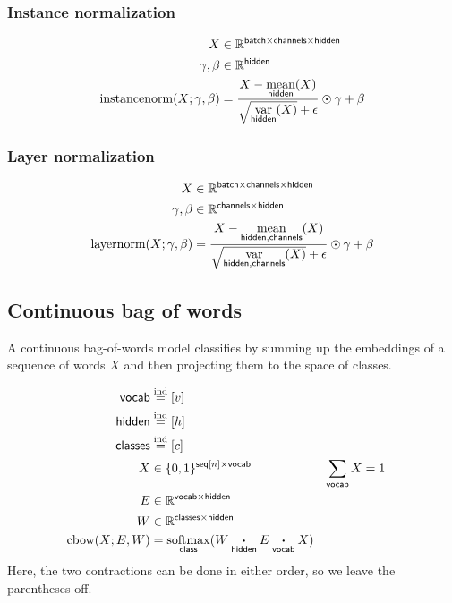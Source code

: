 \documentclass{article}
\newcommand{\reals}{\mathbb{R}}
\begin{document}
\subsubsection*{Instance normalization}

\begin{align*} 
X &\in \reals^{{\name{batch} \times \name{channels} \times \name{hidden}}}\\
\gamma, \beta &\in \reals^{{\name{hidden}}} \\
\text{instancenorm}(X; \gamma, \beta) &= \frac{X - \nfun{hidden}{\text{mean}}(X)}{\sqrt{\nfun{hidden}{\text{var}}(X)} + \epsilon} \odot \gamma + \beta
\end{align*}

\subsubsection*{Layer normalization}

\begin{align*} 
X &\in \reals^{{\name{batch} \times \name{channels} \times \name{hidden}}} \\
\gamma, \beta &\in \reals^{{\name{channels} \times \name{hidden}}} \\
\text{layernorm}(X; \gamma, \beta) &= \frac{X - \nfun{hidden,channels}{\text{mean}}(X)}{\sqrt{\nfun{hidden, channels}{\text{var}}(X)} + \epsilon} \odot \gamma + \beta 
\end{align*}


\subsection{Continuous bag of words}

A continuous bag-of-words model classifies by summing up the embeddings of a sequence of words $X$ and then projecting them to the space of classes. 

\begin{align*}
\name{vocab} &\ndef [v] \\
\name{hidden} &\ndef [h] \\
\name{classes} &\ndef [c] \\
X &\in \{0, 1\}^{{\nset{seq}{n} \times \name{vocab}}} & \nsum{vocab} X &= 1\\
E &\in \reals^{{\name{vocab} \times \name{hidden}}}\\
W &\in \reals^{{\name{classes} \times \name{hidden}}}\\
\text{cbow}(X; E, W) &= \nfun{class}{softmax} (W \ndot{hidden} E \ndot{vocab} X)
\end{align*}
Here, the two contractions can be done in either order, so we leave the parentheses off.
\end{document}
